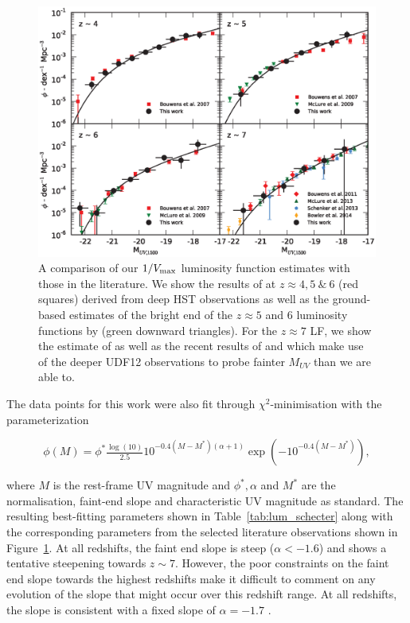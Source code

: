 \begin{figure}
\includegraphics[width=180mm]{plots/fig7.eps}
\caption{A comparison of our $1/V_{\rm{max}}$ luminosity function estimates with those in the literature. We show the results of \citet{2007ApJ...670..928B} at $z \approx 4, 5~\&~6$ (red squares) derived from deep HST observations as well as the ground-based estimates of the bright end of the $z \approx 5$ and 6 luminosity functions by \citet{2009MNRAS.395.2196M}(green downward triangles). For the $z \approx 7$ LF, we show the estimate of \citet{2011ApJ...737...90B} as well as the recent results of \citet{McLure:2013hh} and \citet{Schenker:2013cl} which make use of the deeper UDF12 observations \citep{Koekemoer:2013db} to probe fainter $M_{UV}$ than we are able to.}
\label{fig:luminosityfunctions}
\end{figure}

The data points for this work were also fit through $\chi^2$-minimisation with the \citet{Schechter:1976gl} parameterization

\begin{equation}
  \phi(M) = \phi^{*} \tfrac{\log(10)}{2.5} 10^{-0.4(M-M^{*})(\alpha+1)} 
              \exp{(-10^{-0.4(M-M^{*})})},
\end{equation}

\noindent where $M$ is the rest-frame UV magnitude and $\phi^{*}, \alpha$ and $M^{*}$ are the normalisation, faint-end slope and characteristic UV magnitude as standard. The resulting best-fitting parameters shown in Table~\ref{tab:lum_schecter} along with the corresponding parameters from the selected literature observations shown in Figure~\ref{fig:luminosityfunctions}. At all redshifts, the faint end slope is steep ($\alpha < -1.6$) and shows a tentative steepening towards $z\sim7$. However, the poor constraints on the faint end slope towards the highest redshifts make it difficult to comment on any evolution of the slope that might occur over this redshift range. At all redshifts, the slope is consistent with a fixed slope of $\alpha = -1.7$ \citep{2011ApJ...737...90B}.

